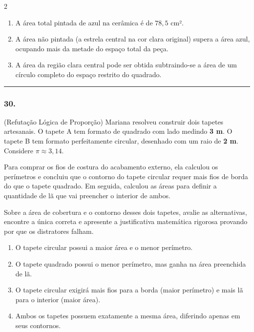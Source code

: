 \documentclass[twoside, 10pt, a4paper]{article}
\newlength{\espacoPreQuestao}\setlength{\espacoPreQuestao}{0.1cm}
\newlength{\espacoQuestao}\setlength{\espacoQuestao}{0.2cm}
\newlength{\espacoAlt}\setlength{\espacoAlt}{0.2cm}
\begin{document}
\begin{multicols*}{2}
\begin{enumerate}[label=\Roman*., itemsep=\espacoAlt]
\item A área total pintada de azul na cerâmica é de $ 78,5 $ cm².
\item A área não pintada (a estrela central na cor clara original) supera a área azul, ocupando mais da metade do espaço total da peça.
\item A área da região clara central pode ser obtida subtraindo-se a área de um círculo completo do espaço restrito do quadrado.
\end{enumerate}
\par\vspace{\espacoQuestao}

\noindent\textcolor{CorLinha}{\rule{\linewidth}{0.5pt}} 
\par\vspace{\espacoPreQuestao}
\subsubsection*{30.} (Refutação Lógica de Proporção) Mariana resolveu construir dois tapetes artesanais. O tapete A tem formato de quadrado com lado medindo \textbf{3 m}. O tapete B tem formato perfeitamente circular, desenhado com um raio de \textbf{2 m}. Considere $ \pi \approx 3,14 $.

Para comprar os fios de costura do acabamento externo, ela calculou os perímetros e concluiu que o contorno do tapete circular requer mais fios de borda do que o tapete quadrado. Em seguida, calculou as áreas para definir a quantidade de lã que vai preencher o interior de ambos. 

Sobre a área de cobertura e o contorno desses dois tapetes, avalie as alternativas, encontre a única correta e apresente a justificativa matemática rigorosa provando por que os distratores falham.

\begin{enumerate}[label=\alph*), itemsep=\espacoAlt]
\item O tapete circular possui a maior área e o menor perímetro.
\item O tapete quadrado possui o menor perímetro, mas ganha na área preenchida de lã.
\item O tapete circular exigirá mais fios para a borda (maior perímetro) e mais lã para o interior (maior área).
\item Ambos os tapetes possuem exatamente a mesma área, diferindo apenas em seus contornos.
\end{enumerate}
\par\vspace{\espacoQuestao}

\end{multicols*}
\end{document}
